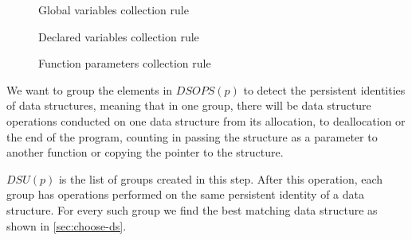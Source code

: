 \documentclass[a4paper,11pt]{article}
\begin{document}
        \begin{figure}[h]
            

            \caption{Global variables collection rule}

            \label{fig:global-collection-rule}
        \end{figure}
        \begin{figure}[h]
            
            \caption{Declared variables collection rule}

            \label{fig:declared-collection-rule}
        \end{figure}
        \begin{figure}[h]
            

            \caption{Function parameters collection rule}

            \label{fig:parameter-collection-rule}
        \end{figure}

        \clearpage


		We want to group the elements in $DSOPS(p)$ to detect the persistent identities \cite{Okasaki} of
		data structures, meaning that in one group, there will be data structure operations conducted on one
		data structure from its allocation, to deallocation or the end of the program, counting in passing the structure as a
		parameter to another function or copying the pointer to the structure.

		$DSU(p)$ is the list of groups created in this step. After this operation, each group has operations performed on the same persistent identity of a data structure. For every such group we find the best matching data structure as shown in 
		\autoref{sec:choose-ds}.
\end{document}
